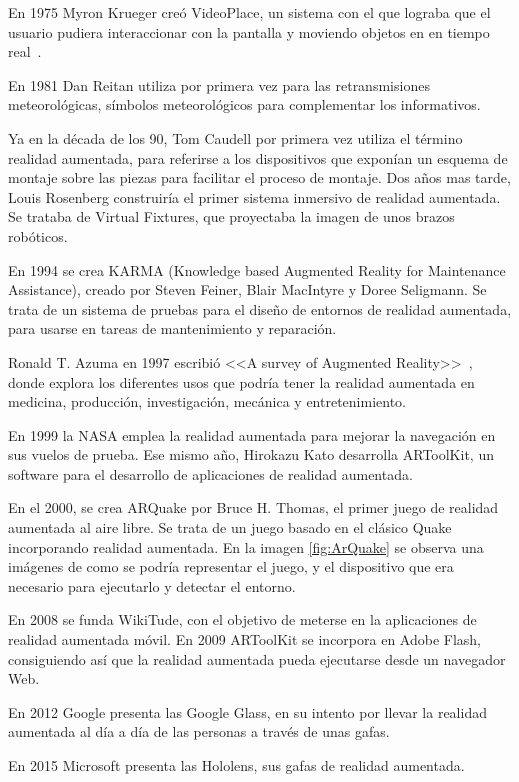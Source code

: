 
En 1975 Myron Krueger creó VideoPlace, un sistema con el que lograba que el usuario pudiera interaccionar con la pantalla y moviendo objetos en en tiempo real~\cite{ARevolution}.



En 1981 Dan Reitan utiliza por primera vez para las retransmisiones meteorológicas, símbolos meteorológicos para complementar los informativos.

Ya en la década de los 90, Tom Caudell por primera vez utiliza el término realidad aumentada, para referirse a los dispositivos que exponían un esquema de montaje sobre las piezas para facilitar el proceso de montaje. 
Dos años mas tarde, Louis Rosenberg construiría el primer sistema inmersivo de realidad aumentada.  Se trataba de Virtual Fixtures, que proyectaba la imagen de unos brazos robóticos.

En 1994 se crea KARMA (Knowledge based Augmented Reality for Maintenance Assistance), creado por  Steven Feiner, Blair MacIntyre y Doree Seligmann. Se trata de un sistema de pruebas para el diseño de entornos de realidad aumentada, para usarse en tareas de mantenimiento y reparación.

Ronald T. Azuma  en 1997 escribió <<A survey of Augmented Reality>>~\cite{azuma1997survey}, donde explora los diferentes usos que podría tener la realidad aumentada en medicina, producción, investigación, mecánica y entretenimiento.

En 1999 la NASA emplea la realidad aumentada para mejorar la navegación en sus vuelos de prueba. Ese mismo año, Hirokazu Kato desarrolla ARToolKit, un software para el desarrollo de aplicaciones de realidad aumentada.



En el 2000, se crea ARQuake por Bruce H. Thomas, el primer juego de realidad aumentada al aire libre. Se trata de un juego basado en el clásico Quake incorporando realidad aumentada. En la imagen \ref{fig:ArQuake} se observa una imágenes de como se podría representar el juego, y el dispositivo que era necesario para ejecutarlo y detectar el entorno.


En 2008 se funda WikiTude, con el objetivo de meterse en la aplicaciones de realidad aumentada móvil. 
En 2009 ARToolKit se incorpora en Adobe Flash, consiguiendo así que la realidad aumentada pueda ejecutarse desde un navegador Web.

En 2012 Google presenta las Google Glass, en su intento por llevar la realidad aumentada al día a día de las personas a través de unas gafas.  

En 2015 Microsoft presenta las Hololens, sus gafas de realidad aumentada.





	
	
	

